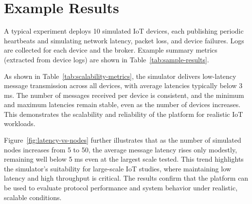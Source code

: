 \documentclass[review]{elsarticle}
\begin{document}
\section{Example Results}
A typical experiment deploys 10 simulated IoT devices, each publishing periodic heartbeats and simulating network latency, packet loss, and device failures. Logs are collected for each device and the broker. Example summary metrics (extracted from device logs) are shown in Table~\ref{tab:sample-results}.

\begin{table}[h]
\centering
\scriptsize
\vspace{0.5em}
\vspace{0.5em}
\caption{Scalability experiments: metrics vs. node count.}
\label{tab:scalability-metrics}
\end{table}

As shown in Table~\ref{tab:scalability-metrics}, the simulator delivers low-latency message transmission across all devices, with average latencies typically below 3 ms. The number of messages received per device is consistent, and the minimum and maximum latencies remain stable, even as the number of devices increases. This demonstrates the scalability and reliability of the platform for realistic IoT workloads.

Figure~\ref{fig:latency-vs-nodes} further illustrates that as the number of simulated nodes increases from 5 to 50, the average message latency rises only modestly, remaining well below 5 ms even at the largest scale tested. This trend highlights the simulator's suitability for large-scale IoT studies, where maintaining low latency and high throughput is critical. The results confirm that the platform can be used to evaluate protocol performance and system behavior under realistic, scalable conditions.
\end{document}
